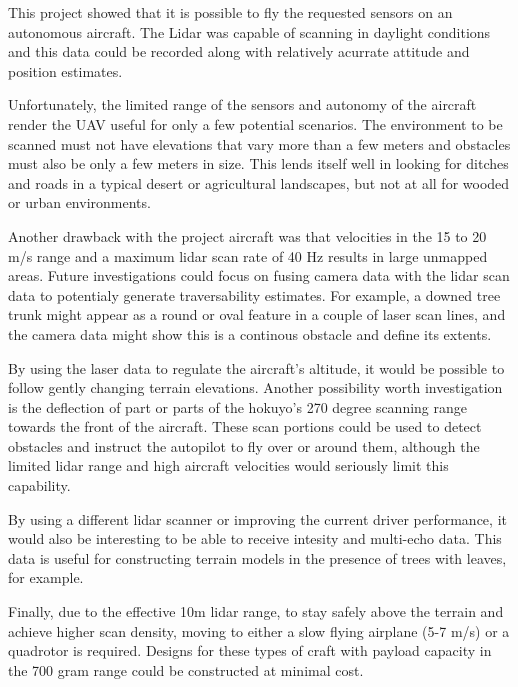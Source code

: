 \documentclass[a4paper,11pt]{report}
\begin{document}
This project showed that it is possible to fly the requested sensors on an autonomous aircraft. The Lidar was capable of scanning in daylight conditions and this data could be recorded along with relatively acurrate attitude and position estimates.

Unfortunately, the limited range of the sensors and autonomy of the aircraft render the UAV useful for only a few potential scenarios. The environment to be scanned must not have elevations that vary more than a few meters and obstacles must also be only a few meters in size. This lends itself well in looking for ditches and roads in a typical desert or agricultural landscapes, but not at all for wooded or urban environments.

Another drawback with the project aircraft was that velocities in the 15 to 20 m/s range and a maximum lidar scan rate of 40 Hz results in large unmapped areas. Future investigations could focus on fusing camera data with the lidar scan data to potentialy generate traversability estimates. For example, a downed tree trunk might appear as a round or oval feature in a couple of laser scan lines, and the camera data might show this is a continous obstacle and define its extents.

By using the laser data to regulate the aircraft's altitude, it would be possible to follow gently changing terrain elevations. Another possibility worth investigation is the deflection of part or parts of the hokuyo's 270 degree scanning range towards the front of the aircraft. These scan portions could be used to detect obstacles and instruct the autopilot to fly over or around them, although the limited lidar range and high aircraft velocities would seriously limit this capability.

By using a different lidar scanner or improving the current driver performance, it would also be interesting to be able to receive intesity and multi-echo data. This data is useful for constructing terrain models in the presence of trees with leaves, for example.

Finally, due to the effective 10m lidar range, to stay safely above the terrain and achieve higher scan density, moving to either a slow flying airplane (5-7 m/s) or a quadrotor is required. Designs for these types of craft with payload capacity in the 700 gram range could be constructed at minimal cost.
\end{document}
